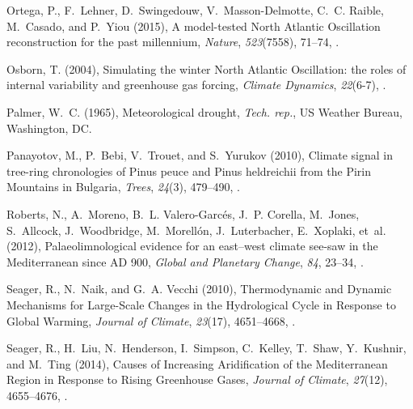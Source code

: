 \documentclass[draft,jgr]{AGUTeX}
\begin{document}
\begin{article}
\begin{thebibliography}{74}
Ortega, P., F.~Lehner, D.~Swingedouw, V.~Masson-Delmotte, C.~C. Raible,
  M.~Casado, and P.~Yiou (2015), {A model-tested North Atlantic Oscillation
  reconstruction for the past millennium}, \textit{Nature}, \textit{523}(7558),
  71--74, .

Osborn, T. (2004), {Simulating the winter North Atlantic Oscillation: the roles
  of internal variability and greenhouse gas forcing}, \textit{Climate
  Dynamics}, \textit{22}(6-7), .

Palmer, W.~C. (1965), {Meteorological drought}, \textit{Tech. rep.}, US Weather
  Bureau, Washington, DC.

Panayotov, M., P.~Bebi, V.~Trouet, and S.~Yurukov (2010), {Climate signal in
  tree-ring chronologies of Pinus peuce and Pinus heldreichii from the Pirin
  Mountains in Bulgaria}, \textit{Trees}, \textit{24}(3), 479--490,
  .

Roberts, N., A.~Moreno, B.~L. Valero-Garc{\'e}s, J.~P. Corella, M.~Jones,
  S.~Allcock, J.~Woodbridge, M.~Morell{\'o}n, J.~Luterbacher, E.~Xoplaki,
  et~al. (2012), {Palaeolimnological evidence for an east--west climate see-saw
  in the Mediterranean since AD 900}, \textit{Global and Planetary Change},
  \textit{84}, 23--34, .

Seager, R., N.~Naik, and G.~A. Vecchi (2010), {Thermodynamic and Dynamic
  Mechanisms for Large-Scale Changes in the Hydrological Cycle in Response to
  Global Warming}, \textit{Journal of Climate}, \textit{23}(17), 4651--4668,
  .

Seager, R., H.~Liu, N.~Henderson, I.~Simpson, C.~Kelley, T.~Shaw, Y.~Kushnir,
  and M.~Ting (2014), {Causes of Increasing Aridification of the Mediterranean
  Region in Response to Rising Greenhouse Gases}, \textit{Journal of Climate},
  \textit{27}(12), 4655--4676, .


\end{thebibliography}
\end{article}
\end{document}
